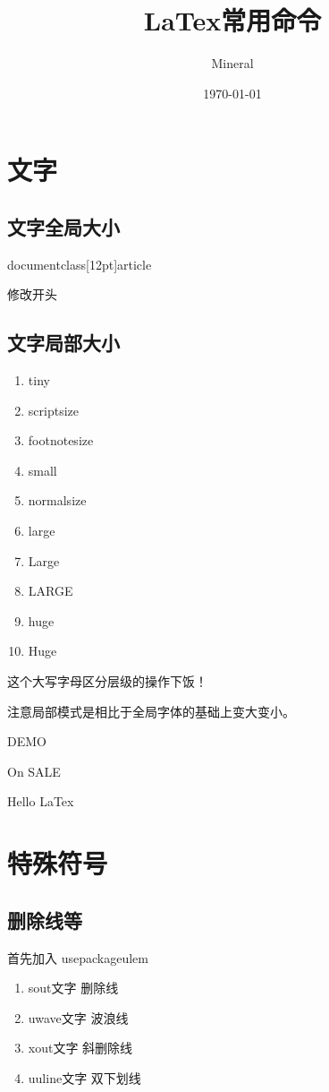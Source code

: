 \documentclass[utf8]{ctexart}
\author{Mineral}
\title{LaTex常用命令}
\date {\today}
\begin{document}
		\maketitle
	    \section{文字}
	    \subsection{文字全局大小}
	    \par documentclass[12pt]{article}	
		\par 修改开头
		\subsection{文字局部大小}
		\begin{enumerate}
				\item tiny
				\item scriptsize
				\item footnotesize
				\item small
				\item normalsize
				\item large
				\item Large
				\item LARGE
				\item huge
				\item Huge									
		\end{enumerate}
		\par 这个大写字母区分层级的操作下饭！
		\par 注意局部模式是相比于全局字体的基础上变大变小。
	    \par \LARGE DEMO
	    \par \Large On SALE	
	    \par \huge Hello LaTex
		\section{特殊符号}
		\subsection{删除线等}
		\par 首先加入 \backlash usepackage{ulem}
		\begin{enumerate}
				\item \backlash sout{文字} 删除线
				\item \backlash uwave{文字} 波浪线	
				\item \backlash xout{文字} 斜删除线
				\item \backlash uuline{文字} 双下划线		
		\end{enumerate}
		

		
\end{document}
